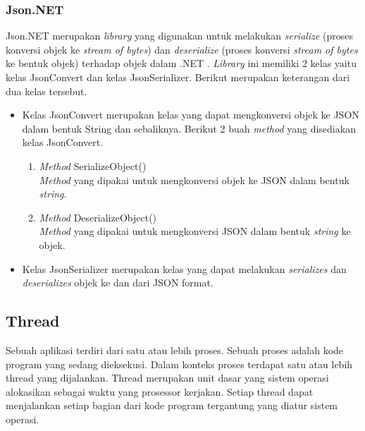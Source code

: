\subsubsection{Json.NET}
\label{subsubsec:Json.NET}
\hspace{0.5cm} Json.NET merupakan \textit{library} yang digunakan untuk melakukan \textit{serialize} (proses konversi objek ke \textit{stream of bytes}) dan \textit{deserialize} (proses konversi \textit{stream of bytes} ke bentuk objek) terhadap objek dalam .NET \cite{jsonNet}. \textit{Library} ini memiliki 2 kelas yaitu kelas JsonConvert dan kelas JsonSerializer. Berikut merupakan keterangan dari dua kelas tersebut.
\begin{itemize}
	\item Kelas JsonConvert merupakan kelas yang dapat mengkonversi objek ke JSON dalam bentuk String dan sebaliknya. Berikut 2 buah \textit{method} yang disediakan kelas JsonConvert. 
		\begin{enumerate}
			\item \textit{Method} SerializeObject() \\
			\textit{Method} yang dipakai untuk mengkonversi objek ke JSON dalam bentuk \textit{string}.
			\item \textit{Method} DeserializeObject()\\
			\textit{Method} yang dipakai untuk mengkonversi JSON dalam bentuk \textit{string} ke objek.
		\end{enumerate}
	\item Kelas JsonSerializer merupakan kelas yang dapat melakukan \textit{serializes} dan \textit{deserializes} objek ke dan dari JSON format.
\end{itemize}

\subsection{Thread}
\label{subsec:Thread}
\hspace{0.5cm} Sebuah aplikasi terdiri dari satu atau lebih proses. Sebuah proses adalah kode program yang sedang dieksekusi. Dalam konteks proses terdapat satu atau lebih thread yang dijalankan. Thread merupakan unit dasar yang sistem operasi alokasikan sebagai waktu yang prosessor kerjakan. Setiap thread dapat menjalankan setiap bagian dari kode program tergantung yang diatur sistem operasi. 

